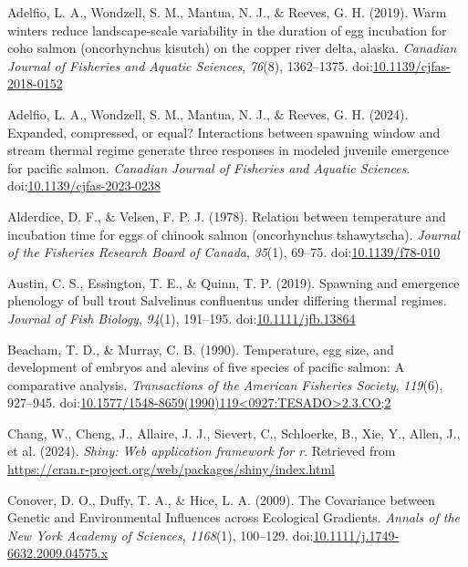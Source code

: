 \documentclass[10pt,a4paper,onecolumn]{article}
\newlength{\cslhangindent}
\newenvironment{CSLReferences}[2] %
 {\begin{list}{}{%
  \setlength{\itemindent}{0pt}
  \setlength{\leftmargin}{0pt}
  \setlength{\parsep}{0pt}
  \ifodd #1
   \setlength{\leftmargin}{\cslhangindent}
   \setlength{\itemindent}{-1\cslhangindent}
  \fi
  \setlength{\itemsep}{#2\baselineskip}}}
 {\end{list}}
\begin{document}
\label{refs}
\begin{CSLReferences}{1}{0}
Adelfio, L. A., Wondzell, S. M., Mantua, N. J., \& Reeves, G. H. (2019).
Warm winters reduce landscape-scale variability in the duration of egg
incubation for coho salmon (oncorhynchus kisutch) on the copper river
delta, alaska. \emph{Canadian Journal of Fisheries and Aquatic
Sciences}, \emph{76}(8), 1362--1375.
doi:\href{https://doi.org/10.1139/cjfas-2018-0152}{10.1139/cjfas-2018-0152}

Adelfio, L. A., Wondzell, S. M., Mantua, N. J., \& Reeves, G. H. (2024).
Expanded, compressed, or equal? Interactions between spawning window and
stream thermal regime generate three responses in modeled juvenile
emergence for pacific salmon. \emph{Canadian Journal of Fisheries and
Aquatic Sciences}.
doi:\href{https://doi.org/10.1139/cjfas-2023-0238}{10.1139/cjfas-2023-0238}

Alderdice, D. F., \& Velsen, F. P. J. (1978). Relation between
temperature and incubation time for eggs of chinook salmon (oncorhynchus
tshawytscha). \emph{Journal of the Fisheries Research Board of Canada},
\emph{35}(1), 69--75.
doi:\href{https://doi.org/10.1139/f78-010}{10.1139/f78-010}

Austin, C. S., Essington, T. E., \& Quinn, T. P. (2019). Spawning and
emergence phenology of bull trout Salvelinus confluentus under differing
thermal regimes. \emph{Journal of Fish Biology}, \emph{94}(1), 191--195.
doi:\href{https://doi.org/10.1111/jfb.13864}{10.1111/jfb.13864}

Beacham, T. D., \& Murray, C. B. (1990). Temperature, egg size, and
development of embryos and alevins of five species of pacific salmon: A
comparative analysis. \emph{Transactions of the American Fisheries
Society}, \emph{119}(6), 927--945.
doi:\href{https://doi.org/10.1577/1548-8659(1990)119\%3C0927:TESADO\%3E2.3.CO;2}{10.1577/1548-8659(1990)119\textless0927:TESADO\textgreater2.3.CO;2}

Chang, W., Cheng, J., Allaire, J. J., Sievert, C., Schloerke, B., Xie,
Y., Allen, J., et al. (2024). \emph{Shiny: Web application framework for
r}. Retrieved from
\url{https://cran.r-project.org/web/packages/shiny/index.html}

Conover, D. O., Duffy, T. A., \& Hice, L. A. (2009). The Covariance
between Genetic and Environmental Influences across Ecological
Gradients. \emph{Annals of the New York Academy of Sciences},
\emph{1168}(1), 100--129.
doi:\href{https://doi.org/10.1111/j.1749-6632.2009.04575.x}{10.1111/j.1749-6632.2009.04575.x}


\end{CSLReferences}
\end{document}
